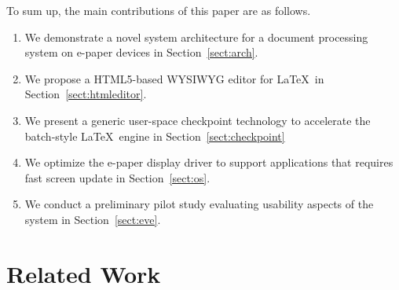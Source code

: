 \documentclass[]{sigchi}
\begin{document}
To sum up, the main contributions of this paper are as follows.
\begin{enumerate}
\item We demonstrate a novel system architecture for a document processing system on e-paper devices in Section~\ref{sect:arch}.
\item We propose a HTML5-based WYSIWYG editor for \LaTeX\ in Section~\ref{sect:htmleditor}.
\item We present a generic user-space checkpoint technology to accelerate the batch-style \LaTeX\ engine in Section~\ref{sect:checkpoint}
\item We optimize the e-paper display driver to support applications that requires fast screen update in Section~\ref{sect:os}.
\item We conduct a preliminary pilot study evaluating usability aspects of the system in Section~\ref{sect:eve}.
\end{enumerate}


\section{Related Work}
\end{document}
